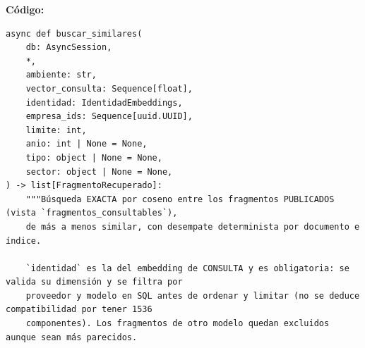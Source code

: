 \documentclass[11pt,a4paper]{article}
\begin{document}
\textbf{Código:}
\begin{lstlisting}
async def buscar_similares(
    db: AsyncSession,
    *,
    ambiente: str,
    vector_consulta: Sequence[float],
    identidad: IdentidadEmbeddings,
    empresa_ids: Sequence[uuid.UUID],
    limite: int,
    anio: int | None = None,
    tipo: object | None = None,
    sector: object | None = None,
) -> list[FragmentoRecuperado]:
    """Búsqueda EXACTA por coseno entre los fragmentos PUBLICADOS (vista `fragmentos_consultables`),
    de más a menos similar, con desempate determinista por documento e índice.

    `identidad` es la del embedding de CONSULTA y es obligatoria: se valida su dimensión y se filtra por
    proveedor y modelo en SQL antes de ordenar y limitar (no se deduce compatibilidad por tener 1536
    componentes). Los fragmentos de otro modelo quedan excluidos aunque sean más parecidos.


\end{lstlisting}
\end{document}
